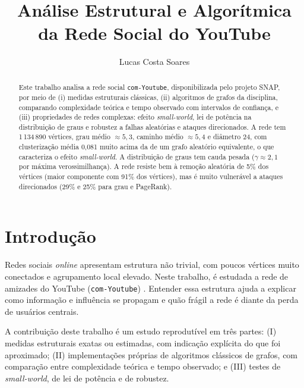 \documentclass[sigconf]{webmedia}
\begin{document}
\title[Análise Estrutural do Grafo com-Youtube]{Análise Estrutural e Algorítmica da Rede Social do YouTube}

\author{Lucas Costa Soares}

\renewcommand{\shortauthors}{Soares}

\begin{abstract}
Este trabalho analisa a rede social \texttt{com-Youtube}, disponibilizada pelo projeto SNAP, por meio de (i) medidas estruturais clássicas, (ii) algoritmos de grafos da disciplina, comparando complexidade teórica e tempo observado com intervalos de confiança, e (iii) propriedades de redes complexas: efeito \emph{small-world}, lei de potência na distribuição de graus e robustez a falhas aleatórias e ataques direcionados. A rede tem 1\,134\,890 vértices, grau médio $\approx 5{,}3$, caminho médio $\approx 5{,}4$ e diâmetro 24, com clusterização média 0,081 muito acima da de um grafo aleatório equivalente, o que caracteriza o efeito \emph{small-world}. A distribuição de graus tem cauda pesada ($\gamma\approx 2{,}1$ por máxima verossimilhança). A rede resiste bem à remoção aleatória de 5\% dos vértices (maior componente com 91\% dos vértices), mas é muito vulnerável a ataques direcionados (29\% e 25\% para grau e PageRank).
\end{abstract}


\maketitle

\section{Introdução}
Redes sociais \emph{online} apresentam estrutura não trivial, com poucos vértices muito conectados e agrupamento local elevado. Neste trabalho, é estudada a rede de amizades do YouTube (\texttt{com-Youtube}) \cite{yang2015defining,snapnets}. Entender essa estrutura ajuda a explicar como informação e influência se propagam e quão frágil a rede é diante da perda de usuários centrais.

A contribuição deste trabalho é um estudo reprodutível em três partes: (I) medidas estruturais exatas ou estimadas, com indicação explícita do que foi aproximado; (II) implementações próprias de algoritmos clássicos de grafos, com comparação entre complexidade teórica e tempo observado; e (III) testes de \emph{small-world}, de lei de potência e de robustez.
\end{document}
